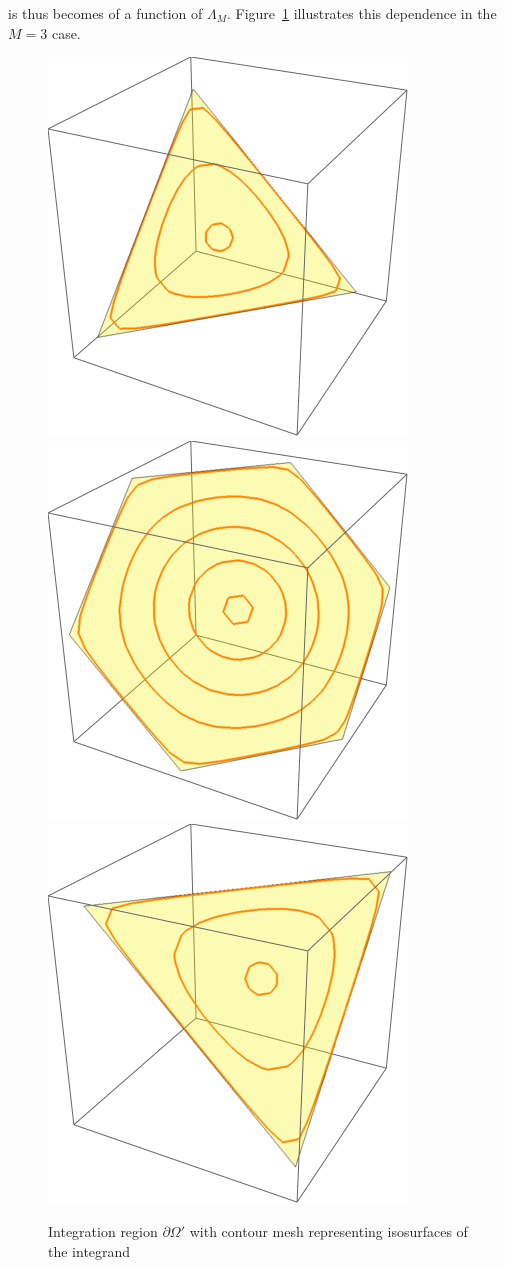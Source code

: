 \documentclass{article}[12pt]
\numberwithin{equation}{section}
\begin{document}
is thus becomes of a function of $\Lambda_M$. Figure~\ref{fig:dos}
illustrates this dependence in the $M=3$ case.
\begin{figure}[H]
\centering{}
\captionsetup{justification=centering}
\includegraphics[scale=0.3]{figures/dos0}
\includegraphics[scale=0.3]{figures/dos1}
\includegraphics[scale=0.3]{figures/dos2}
\caption{Integration region $\partial\Omega'$ with contour mesh
representing isosurfaces of the integrand}
\label{fig:dos}
\end{figure}
\end{document}
